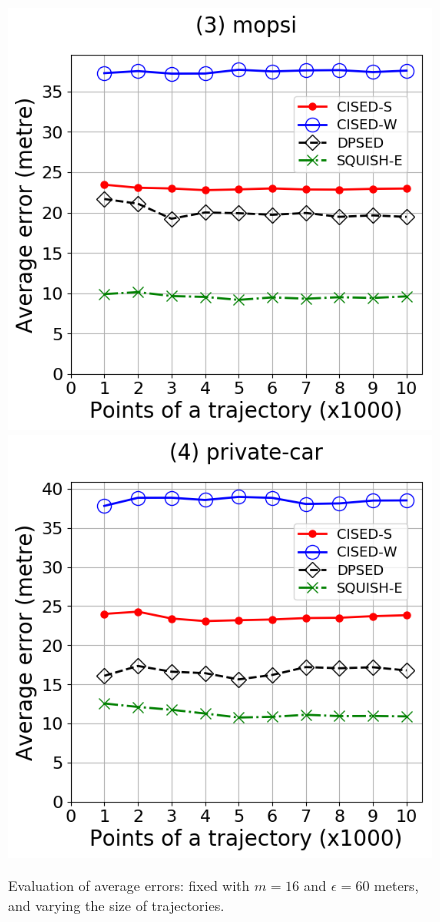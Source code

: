 {\begin{figure}[tb!]
	\includegraphics[scale = 0.2900]{Figures/Exp-error-size-mopsi.png}\hspace{1ex}
	\includegraphics[scale = 0.2900]{Figures/Exp-error-size-private.png}
	\caption{\small Evaluation of average errors: fixed with $m=16$ and $\epsilon=60$ meters, and varying the size of trajectories.}
	\label{fig:ae-size}
\end{figure}


}
